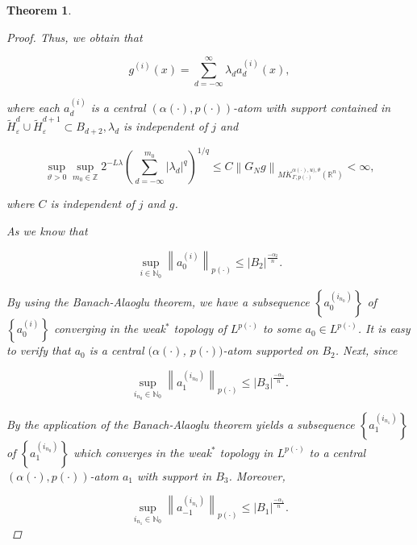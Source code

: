 \documentclass[oneside,reqno]{amsart}
\newtheorem{theorem}{Theorem}[section]
\numberwithin{equation}{section}
\theoremstyle{definition}
\begin{document}
\begin{theorem}
\begin{proof}
Thus, we obtain that


\begin{equation*}
g^{(i)}(x)=\sum_{d=-\infty}^{\infty} \lambda_{d} a_{d}^{(i)}(x),
\end{equation*}


where each $a_{d}^{(i)}$ is a central $(\alpha(\cdot), p(\cdot))$-atom with support contained in $\widetilde{H}^d_{ \varepsilon} \cup \widetilde{H}^{d+1}_{ \varepsilon} \subset B_{d+2}, \lambda_{d}$ is independent of $j$ and


\begin{equation*}
\sup_{\vartheta>0 }\sup _{m_0\in  \mathbb{Z}} 2^{-L \lambda}\left(\sum_{d=-\infty}^{m_0}\left|\lambda_{d}\right|^{q}\right)^{1 / q} \leq  C\left\|G_{N}g \right\|_{{M \dot{K} ^{\alpha(\cdot),u),\theta}_{ \Gamma, p(\cdot)}(\mathbb{R}^n)}}<\infty, 
\end{equation*}


where $C$ is independent of $j$ and $g$.

As we know that 


\begin{equation*}
\sup _{i\in  \mathbb{N}_{0}}\left\|a_{0}^{(i)}\right\|_{{p(\cdot)}} \leq \left|B_{2}\right|^{\frac{-\alpha_{2}}{n}} . 
\end{equation*}


By using the Banach-Alaoglu theorem,  we have  a subsequence $\left\{a_{0}^{\left(i_{n_{0}}\right)}\right\}$ of $\left\{a_{0}^{(i)}\right\}$ converging in the weak$^*$ topology of $L^{p(\cdot)}$ to some $a_{0} \in L^{p(\cdot)}$. It is easy to verify that $a_{0}$ is a central $(\alpha(\cdot)$, $p(\cdot))$-atom supported on $B_{2}$. Next, since


\begin{equation*}
\sup _{i_{n_{0}} \in \mathbb{N}_{0}}\left\|a_{1}^{\left(i_{n_{0}}\right)}\right\|_{{p(\cdot)}} \leq \left|B_{3}\right|^{\frac{-\alpha_{3}} {n}} .
\end{equation*}


By the  application of the Banach-Alaoglu theorem yields a subsequence $\left\{a_{1}^{\left(i_{n_{1}}\right)}\right\}$ of $\left\{a_{1}^{\left(i_{n_{0}}\right)}\right\}$ which converges in the weak$^*$ topology in $L^{p(\cdot)}$ to a central $(\alpha(\cdot), p(\cdot))$-atom $a_{1}$ with support in $B_{3}$. Moreover,


\begin{equation*}
\sup _{i_{n_{1}} \in \mathbb{N}_{0}}\left\|a_{-1}^{\left(i_{n_{1}}\right)}\right\|_{{p(\cdot)}} \leq \left|B_{1}\right|^{\frac{-\alpha_{1}} { n}} .
\end{equation*}



\end{proof}
\end{theorem}
\end{document}
